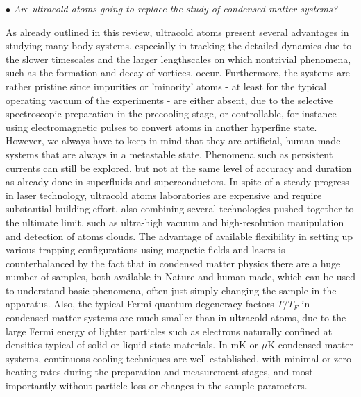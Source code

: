 \documentclass[pra,letterpaper,twocolumn,showpacs,superscriptaddress]{revtex4}
\begin{document}
\vspace{2.0mm}

\noindent
$\bullet$ {\sl Are ultracold atoms going to replace the study of condensed-matter systems?}

As already outlined in this review, ultracold atoms present several advantages in studying many-body systems, especially in tracking the detailed dynamics 
due to the slower timescales and the larger lengthscales on which nontrivial phenomena, such as the formation and decay of vortices, occur. 
Furthermore, the systems are rather pristine since impurities or 'minority' atoms - at least for the typical operating vacuum of the experiments - are either absent, 
due to the selective spectroscopic preparation in the precooling stage, or controllable, for instance using electromagnetic pulses to convert atoms in another 
hyperfine state. However, we always have to keep in mind that they are artificial, human-made systems that are always in a metastable state. 
Phenomena such as persistent currents can still be explored, but not at the same level of accuracy and duration as already done in superfluids and superconductors. 
In spite of a steady progress in laser technology, ultracold atoms laboratories are expensive and require substantial building effort, also combining 
several technologies pushed together to the ultimate limit, such as ultra-high vacuum and high-resolution manipulation and detection of atoms clouds. 
The advantage of available flexibility in setting up various trapping configurations using magnetic fields and lasers is counterbalanced by the fact 
that in condensed matter physics there are a huge number of samples, both available in Nature and human-made, which can be used to understand 
basic phenomena, often just simply changing the sample in the apparatus. Also, the typical Fermi quantum degeneracy factors $T/T_F$ 
in condensed-matter systems are much smaller than in ultracold atoms, due to the large Fermi energy of lighter particles such as electrons 
naturally confined at densities typical of solid or liquid state materials. In mK or $\mu$K condensed-matter systems, continuous cooling techniques are 
well established, with minimal or zero heating rates during the preparation and measurement stages, and most importantly without particle loss or 
changes in the sample parameters. 
\end{document}
